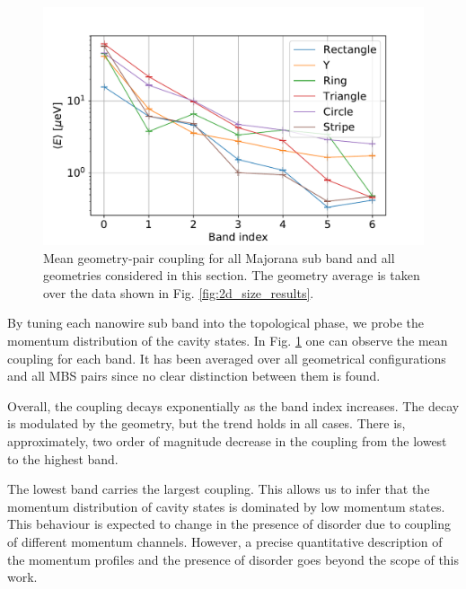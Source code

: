 \begin{figure}[h!]
\centering
  \includegraphics[width=0.6\linewidth]{figures/sub_bands_results.pdf}
  \caption{Mean geometry-pair coupling for all Majorana sub band and all geometries considered in this section. The geometry average is taken over the data shown in Fig. \ref{fig:2d_size_results}.}
  \label{fig:sub_bands}
\end{figure}

By tuning each nanowire sub band into the topological phase, we probe the momentum distribution of the cavity states.
In Fig. \ref{fig:sub_bands} one can observe the mean coupling for each band.
It has been averaged over all geometrical configurations and all MBS pairs since no clear distinction between them is found.

Overall, the coupling decays exponentially as the band index increases.
The decay is modulated by the geometry, but the trend holds in all cases.
There is, approximately, two order of magnitude decrease in the coupling from the lowest to the highest band.

The lowest band carries the largest coupling.
This allows us to infer that the momentum distribution of cavity states is dominated by low momentum states.
This behaviour is expected to change in the presence of disorder due to coupling of different momentum channels.
However, a precise quantitative description of the momentum profiles and the presence of disorder goes beyond the scope of this work.